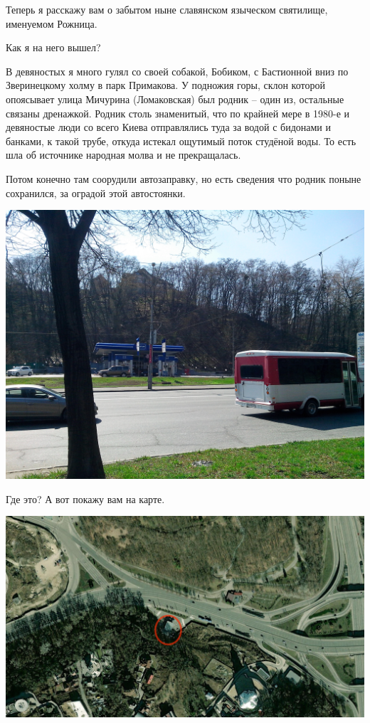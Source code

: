 \documentclass[a5paper,11pt,openany]{article}
\begin{document}
   Теперь я расскажу вам о забытом ныне славянском языческом святилище, именуемом Рожница.

   Как я на него вышел? 

   В девяностых я много гулял со своей собакой, Бобиком, с Бастионной вниз по Зверинецкому холму в парк Примакова. У подножия горы, склон которой опоясывает улица Мичурина (Ломаковская) был родник – один из, остальные связаны дренажкой. Родник столь знаменитый, что по крайней мере в 1980-е и девяностые люди со всего Киева отправлялись туда за водой с бидонами и банками, к такой трубе, откуда истекал ощутимый поток студёной воды. То есть шла об источнике народная молва и не прекращалась.

   Потом конечно там соорудили автозаправку, но есть сведения что родник поныне сохранился, за оградой этой автостоянки.

\begin{center}
\includegraphics[width=\linewidth]{pix/IMG_20150411_131729.jpg}
\end{center}

   Где это? А вот покажу вам на карте.

\begin{center}
\includegraphics[width=\linewidth]{pix/map01.jpg}
\end{center}
\end{document}
